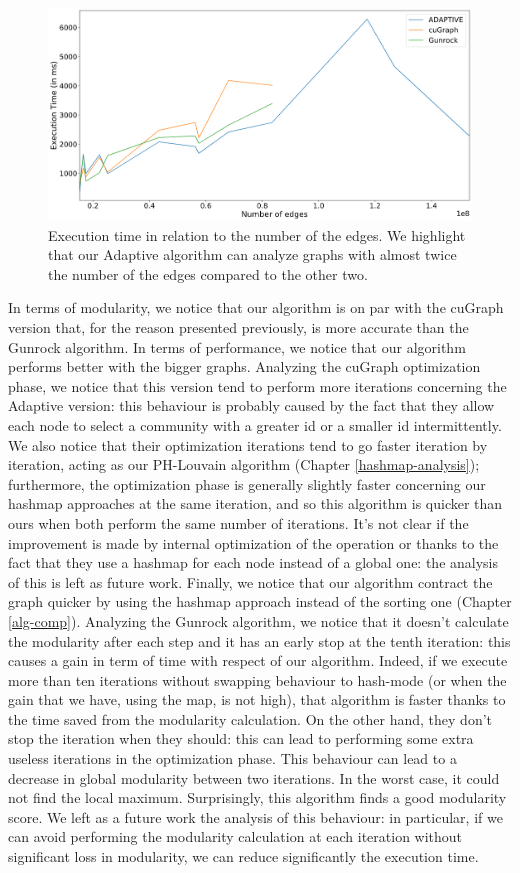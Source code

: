 \begin{figure}[t!]
	\centering
	\includegraphics[width=1\linewidth]{0-resources/execution-time-vs-edges}
	\caption{Execution time in relation to the number of the edges. We highlight that our Adaptive algorithm can analyze graphs with almost twice the number of the edges compared to the other two.}
	\label{fig:execution-time-vs-edges}
\end{figure}
In terms of modularity, we notice that our algorithm is on par with the cuGraph version that, for the reason presented previously, is more accurate than the Gunrock algorithm. In terms of performance, we notice that our algorithm performs better with the bigger graphs. Analyzing the cuGraph optimization phase, we notice that this version tend to perform more iterations concerning the Adaptive version: this behaviour is probably caused by the fact that they allow each node to select a community with a greater id or a smaller id intermittently.
We also notice that their optimization iterations tend to go faster iteration by iteration, acting as our PH-Louvain algorithm (Chapter \ref{hashmap-analysis}); furthermore, the optimization phase is generally slightly faster concerning our hashmap approaches at the same iteration, and so this algorithm is quicker than ours when both perform the same number of iterations. It's not clear if the improvement is made by internal optimization of the operation or thanks to the fact that they use a hashmap for each node instead of a global one: the analysis of this is left as future work. Finally, we notice that our algorithm contract the graph quicker by using the hashmap approach instead of the sorting one (Chapter \ref{alg-comp}).
Analyzing the Gunrock algorithm, we notice that it doesn't calculate the modularity after each step and it has an early stop at the tenth iteration: this causes a gain in term of time with respect of our algorithm. Indeed, if we execute more than ten iterations without swapping behaviour to hash-mode (or when the gain that we have, using the map, is not high), that algorithm is faster thanks to the time saved from the modularity calculation. On the other hand, they don't stop the iteration when they should: this can lead to performing some extra useless iterations in the optimization phase. This behaviour can lead to a decrease in global modularity between two iterations. In the worst case, it could not find the local maximum. Surprisingly, this algorithm finds a good modularity score. We left as a future work the analysis of this behaviour: in particular, if we can avoid performing the modularity calculation at each iteration without significant loss in modularity, we can reduce significantly the execution time.  
